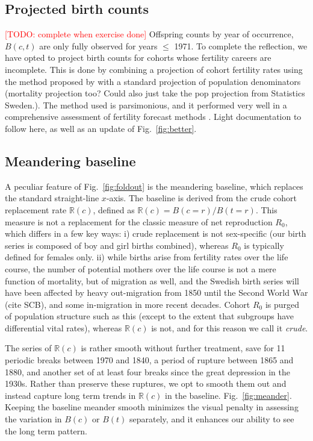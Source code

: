 \documentclass{article}
\newcommand\todo[1]{\textcolor{red}{[TODO: #1]}}
\begin{document}
\subsection{Projected birth counts}
\label{sec:proj}
\todo{complete when exercise done}
Offspring counts by year of occurrence, $B(c,t)$ are only fully observed for years $\le$ 1971. To complete the reflection, we have opted to project birth counts for cohorts whose fertility careers are incomplete. This is done by combining a projection of cohort fertility rates using the method proposed by \citet{de1985time} with a standard projection of population denominators (mortality projection too? Could also just take the pop projection from Statistics Sweden.). The method used is parsimonious, and it performed very well in a comprehensive assessment of fertility forecast methods \citep{bohk2018forecast}. Light documentation to follow here, as well as an update of Fig.~\ref{fig:better}.

\subsection{Meandering baseline}
\label{sec:baseline}
A peculiar feature of Fig.~\ref{fig:foldout} is the meandering baseline, which replaces the standard straight-line $x$-axis. The baseline is derived from the crude cohort replacement rate $\mathbb{R}(c)$, defined as $\mathbb{R}(c) = B(c=r) / B(t=r)$. This measure is not a replacement for the classic measure of net reproduction $R_0$, which differs in a few key ways: i) crude replacement is not sex-specific (our birth series is composed of boy and girl births combined), whereas $R_0$ is typically defined for females only. ii) while births arise from fertility rates over the life course, the number of potential mothers over the life course is not a mere function of mortality, but of migration as well, and the Swedish birth series will have been affected by heavy out-migration from 1850 until the Second World War (cite SCB), and some in-migration in more recent decades. Cohort $R_0$ is purged of population structure such as this (except to the extent that subgroups have differential vital rates), whereas $\mathbb{R}(c)$ is not, and for this reason we call it \emph{crude}.

The series of $\mathbb{R}(c)$ is rather smooth without further treatment, save for 11 periodic breaks between 1970 and 1840, a period of rupture between 1865 and 1880, and another set of at least four breaks since the great depression in the 1930s. Rather than preserve these ruptures, we opt to smooth them out and instead capture long term trends in $\mathbb{R}(c)$ in the baseline. Fig.~\ref{fig:meander}. Keeping the baseline meander smooth minimizes the visual penalty in assessing the variation in $B(c)$ or $B(t)$ separately, and it enhances our ability to see the long term pattern.
\end{document}
